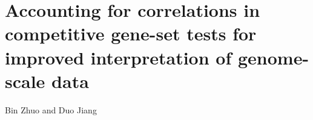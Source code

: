 \section{Accounting for correlations in competitive gene-set
	tests for improved interpretation of genome-scale data}\label{chap3}

\vspace*{5cm}
\begin{centering}
	{\normalsize Bin Zhuo and Duo Jiang}\\[.04\textheight]
\end{centering}	
\vspace*{5cm}

\newpage


	\begin{abstract}
	Competitive gene-set analysis is a widely used tool for interpreting high-throughput biological 
	data, such as gene expression and proteomics data. It aims at testing a known category of genes 
	for enriched association signals in a list of genes inferred from genome-wide data. Most 
	conventional enrichment testing methods ignore or do not properly account for the widespread 
	correlations among genes, which, as we show, can result in mis-calibrated type I error rates 
	and/or power loss. We propose a new framework, \OurMethod, for gene-set test based on a mixed 
	effects quasi-likelihood model, where the data are not required to be Gaussian. Our method 
	effectively adjusts for completely unknown,	unstructured correlations among genes. It uses a 
	score test approach and allows for analytical assessment of $p$-values. Compared to existing 
	methods such as GSEA and CAMERA, our method 
	enjoys robust and substantially improved control 
	over type I error and maintains good power in a variety of correlation structure and 
	association settings. We also present two real data analyses to illustrate our approach.
	\end{abstract}
	
	
